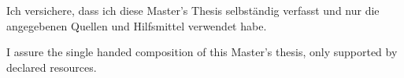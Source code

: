 
\clearemptydoublepage

\thispagestyle{empty}

\vspace*{0.7\textheight}
\noindent
Ich versichere, dass ich diese Master’s Thesis selbständig verfasst und nur die angegebenen Quellen und Hilfsmittel verwendet habe.

\vspace{5mm}
\noindent
I assure the single handed composition of this Master's thesis, only supported by declared resources.

\vspace{15mm}
\noindent
\theplace \quad \thedate \hspace{6cm} \theauthor

\newpage
